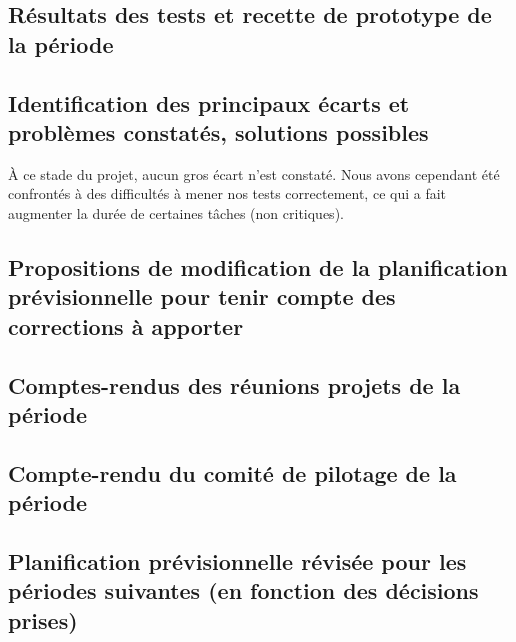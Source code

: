 
\subsection{Résultats des tests et recette de prototype de la période}


\subsection{Identification des principaux écarts et problèmes constatés, solutions possibles}
\`{A} ce stade du projet, aucun gros écart n'est constaté. Nous avons cependant
été confrontés à des difficultés à mener nos tests correctement, ce qui a fait
augmenter la durée de certaines tâches (non critiques).

\subsection{Propositions de modification de la planification prévisionnelle pour tenir compte des corrections à apporter}

\subsection{Comptes-rendus des réunions projets de la période}

\subsection{Compte-rendu du comité de pilotage de la période}

\subsection{Planification prévisionnelle révisée pour les périodes suivantes (en fonction des décisions prises)}

